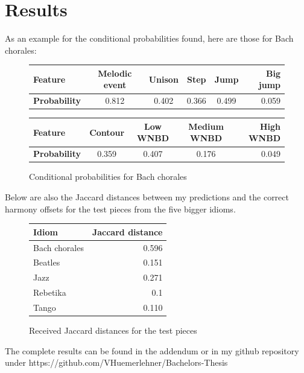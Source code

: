 \documentclass[a4paper,12pt]{report}
\begin{document}
\chapter{Results}
As an example for the conditional probabilities found, here are those for Bach chorales:

\begin{figure}[h]
	\centering
	\begin{tabular}{|l|c|c|c|c|r|}
		\hline
		\textbf{Feature} & Melodic event & Unison & Step & Jump & 		Big jump \\ \hline
		\textbf{Probability} & 0.812 & 0.402 & 0.366 & 0.499 & 0.059 			\\ \hline
	\end{tabular}
	\par
	\vspace{2ex}
	\begin{tabular}{|l|c|c|c|r|}
		\hline
		\textbf{Feature} & Contour & Low WNBD & Medium WNBD & High WNBD \\ 			\hline
		\textbf{Probability} & 0.359 & 0.407 & 0.176 & 0.049 \\ \hline
	\end{tabular}
	\caption{Conditional probabilities for Bach chorales}
\end{figure}
\par
\vspace{1em}

Below are also the Jaccard distances between my predictions and the correct harmony offsets for the test pieces from the five bigger idioms.

\begin{figure}[h]
\centering
	\begin{tabular}{|l|r|}
		\hline
		\textbf{Idiom} & \textbf{Jaccard distance}\\ \hline
		Bach chorales & 0.596 \\ \hline
		Beatles & 0.151 \\ \hline
		Jazz & 0.271 \\ \hline
		Rebetika & 0.1 \\ \hline
		Tango & 0.110 \\ \hline
	\end{tabular}
	\caption{Received Jaccard distances for the test pieces}
\end{figure}
\par
\vspace{1em}

The complete results can be found in the addendum or in my github repository under https://github.com/VHuemerlehner/Bachelors-Thesis
\end{document}

